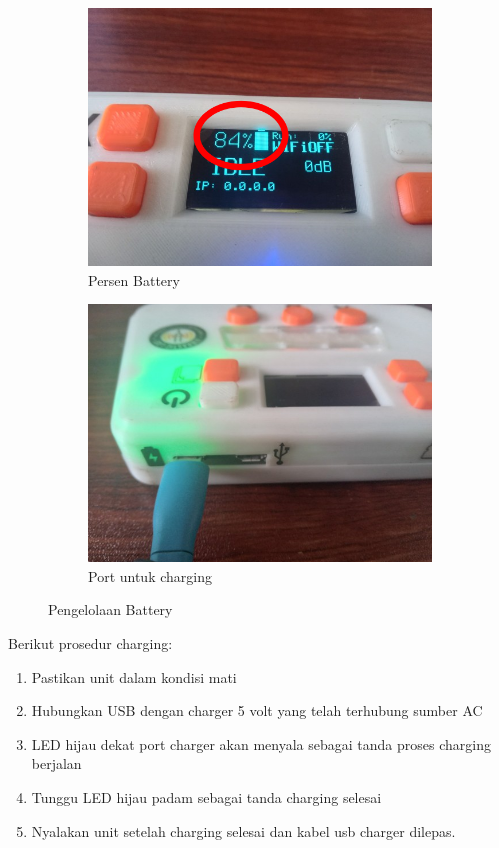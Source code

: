 \documentclass[12pt]{book}
\begin{document}
	\begin{figure}[!ht]
		\centering
		\begin{subfigure}[t]{0.35\textwidth}
			\includegraphics[width=\textwidth]{images/pasang/battchg}
			\caption{Persen Battery}
		\end{subfigure}
		\begin{subfigure}[t]{0.35\textwidth}
			\includegraphics[width=\textwidth]{images/pasang/sambung_charger}
			\caption{Port untuk charging}
		\end{subfigure}

		\caption{Pengelolaan Battery}
	\end{figure}

    Berikut prosedur charging:
    \begin{enumerate}
    	\item Pastikan unit dalam kondisi mati
    	\item Hubungkan USB dengan charger 5 volt yang telah terhubung sumber AC
    	\item LED hijau dekat port charger akan menyala sebagai tanda proses charging berjalan
    	\item Tunggu LED hijau padam sebagai tanda charging selesai
    	\item Nyalakan unit setelah charging selesai dan kabel usb charger dilepas.
    \end{enumerate}
\end{document}
